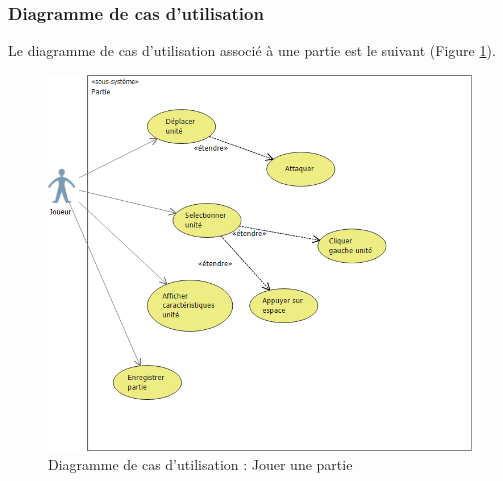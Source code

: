 \documentclass[a4paper,11pt]{article}
\begin{document}
\subsubsection{Diagramme de cas d'utilisation}
Le diagramme de cas d'utilisation associé à une partie est le suivant (Figure \ref{dcu:jp}). 
\begin{figure}[H]
	\centering
	\includegraphics[width=\textwidth]{fig/diagramme_cas_utilisation_partie}
	\caption{Diagramme de cas d'utilisation : Jouer une partie}
	\label{dcu:jp}
\end{figure} 
\end{document}
